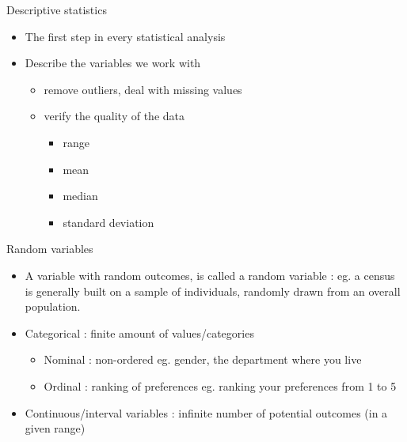 \documentclass[
  ignorenonframetext,
]{beamer}
\providecommand{\tightlist}{%
  \setlength{\itemsep}{0pt}\setlength{\parskip}{0pt}}
\begin{document}
\begin{frame}{Descriptive statistics}
\label{descriptive-statistics-1}
\begin{itemize}
\tightlist
\item
  The first step in every statistical analysis
\item
  Describe the variables we work with

  \begin{itemize}
  \tightlist
  \item
    remove outliers, deal with missing values
  \item
    verify the quality of the data

    \begin{itemize}
    \tightlist
    \item
      range
    \item
      mean
    \item
      median
    \item
      standard deviation
    \end{itemize}
  \end{itemize}
\end{itemize}
\end{frame}

\begin{frame}{Random variables}
\label{random-variables}
\begin{itemize}
\tightlist
\item
  A variable with random outcomes, is called a random variable : eg. a
  census is generally built on a sample of individuals, randomly drawn
  from an overall population.
\item
  Categorical : finite amount of values/categories

  \begin{itemize}
  \tightlist
  \item
    Nominal : non-ordered eg. gender, the department where you live
  \item
    Ordinal : ranking of preferences eg. ranking your preferences from 1
    to 5
  \end{itemize}
\item
  Continuous/interval variables : infinite number of potential outcomes
  (in a given range)
\end{itemize}
\end{frame}
\end{document}
